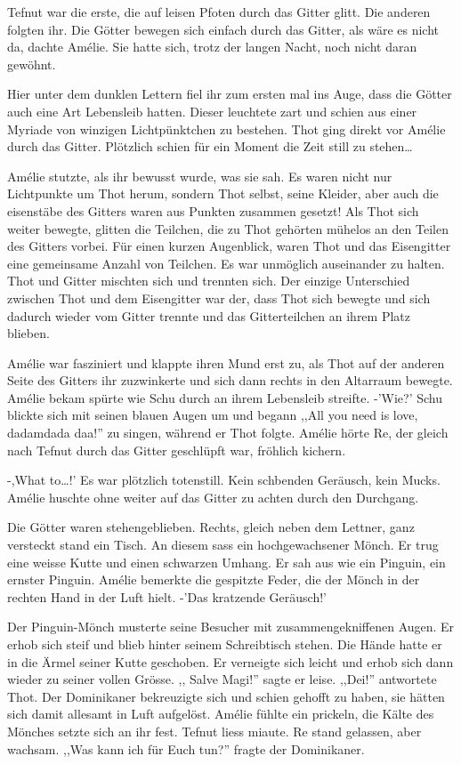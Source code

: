 \documentclass[11pt,titlepage,a5paper]{book}
\begin{document}
Tefnut war die erste, die auf leisen Pfoten durch das Gitter glitt. Die anderen folgten ihr. Die Götter bewegen sich einfach durch das Gitter, als wäre es nicht da, dachte Amélie. Sie hatte sich, trotz der langen Nacht, noch nicht daran gewöhnt. 

Hier unter dem dunklen Lettern fiel ihr zum ersten mal ins Auge, dass die Götter auch eine Art Lebensleib hatten. Dieser leuchtete zart und schien aus einer Myriade von winzigen Lichtpünktchen zu bestehen. Thot ging direkt vor Amélie durch das Gitter. Plötzlich schien für ein Moment die Zeit still zu stehen\dots

Amélie stutzte, als ihr bewusst wurde, was sie sah. Es waren nicht nur Lichtpunkte um Thot herum, sondern Thot selbst, seine Kleider, aber auch die eisenstäbe des Gitters waren aus Punkten zusammen gesetzt! Als Thot sich weiter bewegte, glitten die Teilchen, die zu Thot gehörten mühelos an den Teilen des Gitters vorbei. Für einen kurzen Augenblick, waren Thot und das Eisengitter eine gemeinsame Anzahl von Teilchen. Es war unmöglich auseinander zu halten. Thot und Gitter mischten sich und trennten sich. Der einzige Unterschied zwischen Thot und dem Eisengitter war der, dass Thot sich bewegte und sich dadurch wieder vom Gitter trennte und das Gitterteilchen an ihrem Platz blieben.

Amélie war fasziniert und klappte ihren Mund erst zu, als Thot auf der anderen Seite des Gitters ihr zuzwinkerte und sich dann rechts in den Altarraum bewegte. Amélie bekam spürte wie Schu durch an ihrem Lebensleib streifte. -'Wie?' Schu blickte sich mit seinen blauen Augen um und begann ,,All you need is love, dadamdada daa!'' zu singen, während er Thot folgte. Amélie hörte Re, der gleich nach Tefnut durch das Gitter geschlüpft war, fröhlich kichern.

-,What to\dots !' Es war plötzlich totenstill. Kein schbenden Geräusch, kein Mucks. Amélie huschte ohne weiter auf das Gitter zu achten durch den Durchgang. 

Die Götter waren stehengeblieben. Rechts, gleich neben dem Lettner, ganz versteckt stand ein Tisch. An diesem sass ein hochgewachsener Mönch. Er trug eine weisse Kutte und einen schwarzen Umhang. Er sah aus wie ein Pinguin, ein ernster Pinguin. Amélie bemerkte die gespitzte Feder, die der Mönch in der rechten Hand in der Luft hielt. -'Das kratzende Geräusch!' 

Der Pinguin-Mönch musterte seine Besucher mit zusammengekniffenen Augen. Er erhob sich steif und blieb hinter seinem Schreibtisch stehen. Die Hände hatte er in die Ärmel seiner Kutte geschoben. Er verneigte sich leicht und erhob sich dann wieder zu seiner vollen Grösse.
,, Salve Magi!'' sagte er leise. ,,Dei!'' antwortete Thot. Der Dominikaner bekreuzigte sich und schien gehofft zu haben, sie hätten sich damit allesamt in Luft aufgelöst. Amélie fühlte ein prickeln, die Kälte des Mönches setzte sich an ihr fest. Tefnut liess miaute. Re stand gelassen, aber wachsam. ,,Was kann ich für Euch tun?'' fragte der Dominikaner.
\end{document}
